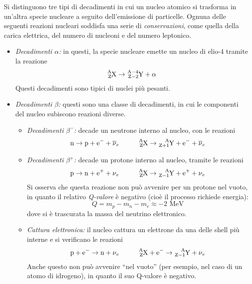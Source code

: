 \documentclass[11pt, a4paper]{scrartcl}
\theoremstyle{style}
\numberwithin{equation}{subsection}
\begin{document}
Si distinguono tre tipi di decadimenti in cui un nucleo atomico si trasforma in un'altra specie nucleare a seguito dell'emissione di particelle.
Ognuna delle seguenti reazioni nucleari soddisfa una serie di \textit{conservazioni}, come quella della carica elettrica, del numero di nucleoni e del numero leptonico.
\begin{itemize}
	\item \textit{Decadimenti $\alpha $:} in questi, la specie nucleare emette un nucleo di elio-4 tramite la reazione
		\begin{equation}
			\ce{^A_ZX} \to \ce{^{A-4}_{Z-2}Y + \alpha}
		\end{equation}
		Questi decadimenti sono tipici di nuclei pi\`u pesanti.
	\item \textit{Decadimenti $\beta $:} questi sono una classe di decadimenti, in cui le componenti del nucleo subiscono reazioni diverse.
		\begin{itemize}
			\item \textit{Decadimenti $\beta ^-$:} decade un neutrone interno al nucleo, con le reazioni
			\begin{equation}
			\ce{n} \to  \ce{p + e- + \overline{\nu }_e} \hspace{1cm} \ce{^A_ZX} \to \ce{^A_{Z+1}Y + e- + \overline{\nu }_e}
			\end{equation}	
		\item \textit{Decadimenti $\beta ^+$:} decade un protone interno al nucleo, tramite le reazioni
		\begin{equation}
		\ce{p} \to  \ce{n + e+ + \nu _e} \hspace{1cm} \ce{^A_ZX} \to  \ce{^A_{Z-1}Y + e+ + \nu_e}
		\end{equation}	
		Si osserva che questa reazione non pu\`o avvenire per un protone nel vuoto, in quanto il relativo \textit{Q-valore} \`e negativo (cio\`e il processo richiede energia):
		\[
		Q = m_p - m_n - m_e \approx -2 \text{ MeV}
		\] 
	dove si \`e trascurata la massa del neutrino elettronico.	
\item \textit{Cattura elettronica:} il nucleo cattura un elettrone da una delle shell pi\`u interne e si verificano le reazioni
\begin{equation}
\ce{p + e-} \to  \ce{n + \nu _e} \hspace{1cm} \ce{^A_ZX + e-} \to  \ce{^A_{Z-1}Y + \nu _e} 
\end{equation}	
Anche questo non pu\`o avvenire ``nel vuoto'' (per esempio, nel caso di un atomo di idrogeno), in quanto il suo Q-valore \`e negativo.

\end{itemize}
\end{itemize}
\end{document}
